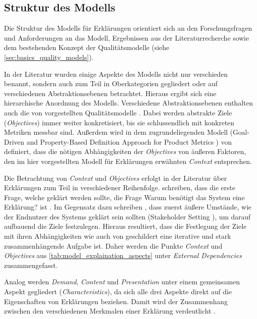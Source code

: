 \subsection{Struktur des Modells}

Die Struktur des Modells für Erklärungen orientiert sich an den Forschungsfragen und Anforderungen an das Modell, Ergebnissen aus der Literaturrecherche sowie dem bestehenden Konzept der Qualitätsmodelle \cite{schneider2012abenteuer} (siehe \autoref{sec:basics_quality_models}).

In der Literatur wurden einige Aspekte des Modells nicht nur verschieden benannt, sondern auch zum Teil in Oberkategorien gegliedert oder auf verschiedenen Abstraktionsebenen betrachtet. Hieraus ergibt sich eine hierarchische Anordnung des Modells. Verschiedene Abstraktionsebenen enthalten auch die von \citeauthor{schneider2012abenteuer} vorgestellten Qualitätsmodelle \cite{schneider2012abenteuer}. Dabei werden abstrakte Ziele (\textit{Objectives}) immer weiter konkretisiert, bis sie schlussendlich mit konkreten Metriken messbar sind. Außerdem wird in dem zugrundeliegenden Modell (\glqq Goal-Driven and Property-Based Definition Approach for Product Metrics\grqq{} \cite{briand1995goal}) von \citeauthor{briand1995goal} definiert, dass die nötigen Abhängigkeiten der \textit{Objectives} von äußeren Faktoren, den im hier vorgestellten Modell für Erklärungen erwähnten \textit{Context} entsprechen.

Die Betrachtung von \textit{Context} und \textit{Objectives} erfolgt in der Literatur über Erklärungen zum Teil in verschiedener Reihenfolge. \citeauthor{rosenfeld_explainability_2019} schreiben, dass die erste Frage, welche geklärt werden sollte, die Frage \glqq Warum benötigt das System eine Erklärung?\grqq{} ist \cite[vgl. S. 699][]{rosenfeld_explainability_2019}\cite{nunes_systematic_2017}. Im Gegensatz dazu schreiben \citeauthor{cirqueira_scenario-based_2020}, dass zuerst äußere Umstände, wie der Endnutzer des Systems geklärt sein sollten (\glqq Stakeholder Setting\grqq{} \cite{cirqueira_scenario-based_2020}), um darauf aufbauend die Ziele festzulegen. Hieraus resultiert, dass die Festlegung der Ziele mit ihren Abhängigkeiten wie auch von \cite{schneider2012abenteuer} geschildert eine iterative und stark zusammenhängende Aufgabe ist. Daher werden die Punkte \textit{Context} und \textit{Objectives} aus \autoref{tab:model_explaination_aspects} unter \textit{External Dependencies} zusammengefasst.

Analog werden \textit{Demand}, \textit{Content} und \textit{Presentation} unter einem gemeinsamen Aspekt gegliedert (\textit{Characteristics}), da sich alle drei Aspekte direkt auf die Eigenschaften von Erklärungen beziehen. Damit wird der Zusammenhang zwischen den verschiedenen Merkmalen einer Erklärung verdeutlicht \cite{nunes_systematic_2017}.

